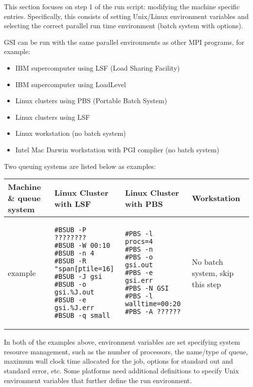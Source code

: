 
This section focuses on step 1 of the run script: modifying the machine specific entries. Specifically, this consists of setting Unix/Linux environment variables and selecting the correct parallel run time environment (batch system with options). 

GSI can be run with the same parallel environments as other MPI programs, for example:

\begin{itemize}
\item IBM supercomputer using LSF (Load Sharing Facility)
\item IBM supercomputer using LoadLevel
\item Linux clusters using PBS (Portable Batch System)
\item Linux clusters using LSF
\item Linux workstation (no batch system)
\item Intel Mac Darwin workstation with PGI complier (no batch system)
\end{itemize}

Two queuing systems are listed below as examples:

\begin{table}[htbp]\centering
\begin{tabular}{|p{2.6cm}|p{4.5cm}|p{4.5cm}|p{2.5cm}|}
\hline
\hline
Machine \& queue system & Linux Cluster with LSF & Linux Cluster with PBS & Workstation \\
\hline
\hline
example
&
\begin{footnotesize}
\begin{verbatim}
#BSUB -P ???????? 
#BSUB -W 00:10 
#BSUB -n 4 
#BSUB -R "span[ptile=16]
#BSUB -J gsi 
#BSUB -o gsi.%J.out 
#BSUB -e gsi.%J.err 
#BSUB -q small
\end{verbatim}
\end{footnotesize}
&
\begin{footnotesize}
\begin{verbatim}
#PBS -l procs=4
#PBS -n
#PBS -o gsi.out
#PBS -e gsi.err
#PBS -N GSI
#PBS -l walltime=00:20
#PBS -A ??????
\end{verbatim}
\end{footnotesize}
&
No batch system, 
skip this step
\\
\hline
\end{tabular}
\label{t35}
\end{table} 

In both of the examples above, environment variables are set specifying system resource management, such as the number of processors, the name/type of queue, maximum wall clock time allocated for the job, options for standard out and standard error, etc. Some platforms need additional definitions to specify Unix environment variables that further define the run environment. 

